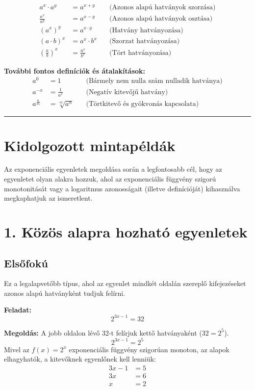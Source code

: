 \documentclass[11pt, a4paper]{article}
\begin{document}
\begin{align*}
a^x \cdot a^y &= a^{x+y} \quad &\text{(Azonos alapú hatványok szorzása)} \\
\frac{a^x}{a^y} &= a^{x-y} \quad &\text{(Azonos alapú hatványok osztása)} \\
(a^x)^y &= a^{x \cdot y} \quad &\text{(Hatvány hatványozása)} \\
(a \cdot b)^x &= a^x \cdot b^x \quad &\text{(Szorzat hatványozása)} \\
\left(\frac{a}{b}\right)^x &= \frac{a^x}{b^x} \quad &\text{(Tört hatványozása)}
\end{align*}

\textbf{További fontos definíciók és átalakítások:}
\begin{align*}
a^0 &= 1 \quad &\text{(Bármely nem nulla szám nulladik hatványa)} \\
a^{-x} &= \frac{1}{a^x} \quad &\text{(Negatív kitevőjű hatvány)} \\
a^{\frac{n}{m}} &= \sqrt[m]{a^n} \quad &\text{(Törtkitevő és gyökvonás kapcsolata)}
\end{align*}

\vspace{0.5cm}
\hrule
\vspace{0.5cm}

\section*{Kidolgozott mintapéldák}

Az exponenciális egyenletek megoldása során a legfontosabb cél, hogy az egyenletet olyan alakra hozzuk, ahol az exponenciális függvény szigorú monotonitását vagy a logaritmus azonosságait (illetve definícióját) kihasználva megkaphatjuk az ismeretlent.

\section*{1. Közös alapra hozható egyenletek}
\subsection*{Elsőfokú}
Ez a legalapvetőbb típus, ahol az egyenlet mindkét oldalán szereplő kifejezéseket azonos alapú hatványként tudjuk felírni.

\textbf{Feladat:}
\[ 2^{3x-1} = 32 \]

\textbf{Megoldás:}
A jobb oldalon lévő 32-t felírjuk kettő hatványaként ($32 = 2^5$).
\[ 2^{3x-1} = 2^5 \]
Mivel az $f(x) = 2^x$ exponenciális függvény szigorúan monoton, az alapok elhagyhatók, a kitevőknek egyenlőnek kell lenniük:
\begin{align*}
3x - 1 &= 5 \\
3x &= 6 \\
x &= 2
\end{align*}
\end{document}
